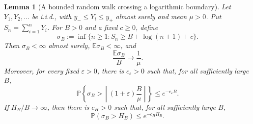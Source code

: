 \documentclass[12pt]{article}
\theoremstyle{spaced}
\newtheorem{lemma}[lemma]{Lemma}
\theoremstyle{remark}
\newcommand{\E}{\mathbb E}
\newcommand{\bbP}{\mathbb P}
\begin{document}
\begin{lemma}[A bounded random walk crossing a logarithmic boundary]
\label{lem:UP-log-boundary-hitting}
Let $Y_1,Y_2,\ldots$ be i.i.d., with
$y_-\le Y_i\le y_+$ almost surely and mean $\mu>0$.  Put
$S_n=\sum_{i=1}^nY_i$.  For $B>0$ and a fixed $c\ge0$, define
\begin{equation}
\label{eq:UP-log-boundary-stopping}
 \sigma_B:=\inf\{n\ge1:S_n\ge B+\log(n+1)+c\}.
\end{equation}
Then $\sigma_B<\infty$ almost surely, $\E\sigma_B<\infty$, and
\begin{equation}
\label{eq:UP-log-boundary-expectation}
 \frac{\E\sigma_B}{B}\longrightarrow\frac1\mu.
\end{equation}
Moreover, for every fixed $\varepsilon>0$, there is $c_\varepsilon>0$ such
that, for all sufficiently large $B$,
\begin{equation}
\label{eq:UP-log-boundary-fixed-tail}
 \bbP\left\{
   \sigma_B>
   \left\lceil(1+\varepsilon)\frac{B}{\mu}\right\rceil
 \right\}
 \le e^{-c_\varepsilon B}.
\end{equation}
If $H_B/B\to\infty$, then there is $c_H>0$ such that, for all sufficiently
large $B$,
\begin{equation}
\label{eq:UP-log-boundary-long-tail}
 \bbP(\sigma_B>H_B)\le e^{-c_HH_B}.
\end{equation}
\end{lemma}
\end{document}
